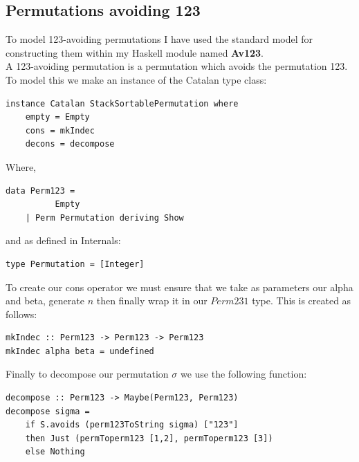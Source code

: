 \documentclass[12pt]{article}
\begin{document}
\subsection {Permutations avoiding 123}
To model 123-avoiding permutations I have used the standard model for constructing them within my Haskell module named {\bf Av123}.\\
A 123-avoiding permutation is a permutation which avoids the permutation 123.  To model this we make an instance of the Catalan type class:
\begin{lstlisting}
instance Catalan StackSortablePermutation where
	empty = Empty	
	cons = mkIndec
	decons = decompose
\end{lstlisting}
Where, 
\begin{lstlisting}
data Perm123 = 
          Empty 
	| Perm Permutation deriving Show
\end{lstlisting}
and as defined in Internals:
\begin{lstlisting}
type Permutation = [Integer]
\end{lstlisting}

To create our cons operator we must ensure that we take as parameters our alpha and beta, generate $n$ then finally wrap it in our $Perm231$ type. This is created as follows:
\begin{lstlisting}
mkIndec :: Perm123 -> Perm123 -> Perm123
mkIndec alpha beta = undefined
\end{lstlisting}
Finally to decompose our permutation $\sigma$ we use the following function:
\begin{lstlisting}
decompose :: Perm123 -> Maybe(Perm123, Perm123)
decompose sigma = 
	if S.avoids (perm123ToString sigma) ["123"]
	then Just (permToperm123 [1,2], permToperm123 [3]) 
	else Nothing
\end{lstlisting}
\end{document}
